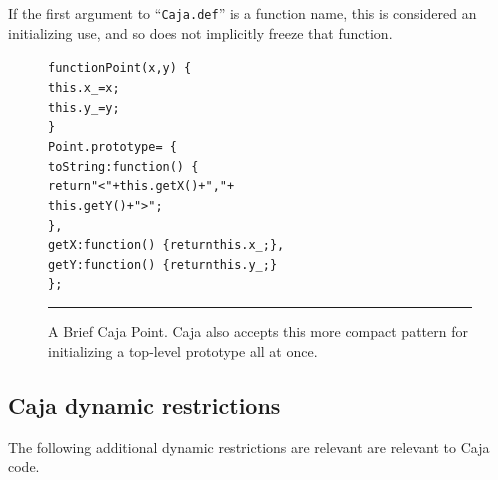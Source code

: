 \documentclass[letterpaper,twocolumn,10pt]{article}
\newcommand{\code}[1]{{\tt {#1}}}              %
\begin{document}
If the first argument to ``\code{Caja.def}'' is a function name, this is 
considered an initializing use, and so does not implicitly freeze that 
function. 



\begin{figure}[t!]
\begin{alltt}
function Point(x, y)\ \{
  this.x\_ = x;
  this.y\_ = y;
\}
Point.prototype =\ \{
  toString: function()\ \{ 
    return "<" + this.getX() + "," + 
                 this.getY() + ">"; 
  \},
  getX: function()\ \{ return this.x\_; \},
  getY: function()\ \{ return this.y\_; \}
\};
\end{alltt}

\caption[A Brief Caja Point.]{A Brief Caja Point. Caja also accepts this more 
compact pattern for initializing a top-level prototype all at once. \\ } 
\hrule
\label{fig:brief-caja-point}
\end{figure}


\subsection{Caja dynamic restrictions}
\label{subsec:caja-dynamic}

The following additional dynamic restrictions are relevant are relevant to
Caja code.
\end{document}
